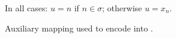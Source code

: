 \begin{figure}[t]
\begin{center}
{\small In all cases: $u = n$ if $n\in \sigma$; otherwise $u = x_n$.}
\end{center}
\caption{\label{f:auxmap} Auxiliary mapping used to encode \HOp into \HO.}
\Hlinefig 
\end{figure}

